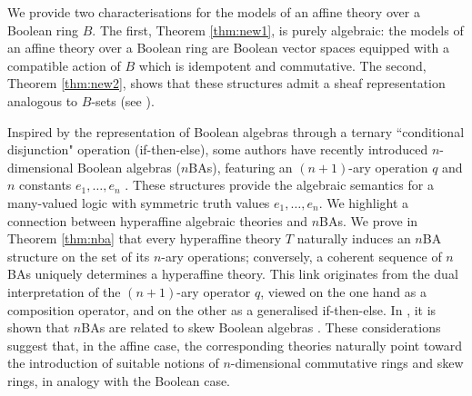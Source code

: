 \documentclass{amsart}
\numberwithin{equation}{section}
\theoremstyle{plain}
\theoremstyle{definition}
\begin{document}
We provide two characterisations for the models of an affine theory over a Boolean ring $B$.
The first, Theorem \ref{thm:new1}, is purely algebraic:
the models of an affine theory over a Boolean ring are Boolean vector spaces equipped with a compatible action of $B$ which is idempotent and commutative. 
The second, Theorem \ref{thm:new2}, shows that these structures admit a sheaf representation analogous to $B$-sets (see \cite{B91}).


Inspired by the representation of Boolean algebras through a ternary ``conditional disjunction" operation (if-then-else), some authors have recently introduced $n$-dimensional Boolean algebras ($n$BAs), featuring an $(n+1)$-ary operation $q$ and $n$ constants $e_1, \ldots, e_n$ \cite{BS,BLPS18,SBLP20}. 
These structures provide the algebraic semantics for a many-valued logic with symmetric truth values $e_1, \ldots, e_n$. 
We highlight a connection between hyperaffine algebraic theories and $n$BAs. 
We prove in Theorem \ref{thm:nba} that every hyperaffine theory $T$ naturally induces an $n$BA structure on the set of its $n$-ary operations; 
conversely, a coherent sequence of $n$BAs uniquely determines a hyperaffine theory. 
This link originates from the dual interpretation of the $(n+1)$-ary operator $q$, viewed on the one hand as a composition operator, and on the other as a generalised if-then-else.
In \cite{BS}, it is shown that $n$BAs are related to skew Boolean algebras \cite{Leech1}.  
These considerations suggest that, in the affine case, the corresponding theories naturally point toward the introduction of suitable notions of $n$-dimensional commutative rings and skew rings, in analogy with the Boolean case.
\end{document}
